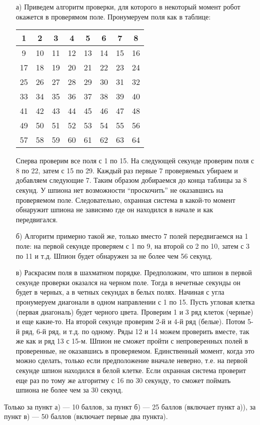 \solutionSection
\begin{enumerate}
    \item [а)] Приведем алгоритм проверки, для которого в некоторый момент робот окажется в проверямом поле. Пронумеруем поля как в таблице:
    \begin{center}
    \begin{tabular}{|c|c|c|c|c|c|c|c|}\hline
     {1} &  {2} &  {3} &  {4} &  {5} &  {6} &  {7} &  {8}\\\hline
     {9} &  {10} &  {11} &  {12} &  {13} &  {14} &  {15} &  {16}\\\hline
     {17} &  {18} &  {19} &  {20} &  {21} &  {22} &  {23} &  {24}\\\hline
     {25} &  {26} &  {27} &  {28} &  {29} &  {30} &  {31} &  {32}\\\hline
     {33} &  {34} &  {35} &  {36} &  {37} &  {38} &  {39} &  {40}\\\hline
     {41} &  {42} &  {43} &  {44} &  {45} &  {46} &  {47} &  {48}\\\hline
     {49} &  {50} &  {51} &  {52} &  {53} &  {54} &  {55} &  {56}\\\hline
     {57} &  {58} &  {59} &  {60} &  {61} &  {62} &  {63} &  {64}\\\hline
    \end{tabular}
    \end{center}
    
    
    Сперва проверим все поля с 1 по 15. На следующей секунде проверим поля с 8 по 22, затем с 15 по 29. Каждый раз первые 7 проверяемых убираем и добавляем следующие 7. Таким образом добираемся до конца таблицы за 8 секунд. У шпиона нет возможности ``проскочить'' не оказавшись на проверяемом поле. Следовательно, охранная система в какой-то момент обнаружит шпиона не зависимо где он находился в начале и как передвигался.
    
    \item [б)] Алгоритм примерно такой же, только вместо 7 полей передвигаемся на 1 поле: на первой секунде проверяем с 1 по 9, на второй со 2 по 10, затем с 3 по 11 и т.д. Шпион будет обнаружен за не более чем 56 секунд.
    
    \item [в)] Раскрасим поля в шахматном порядке. Предположим, что шпион в первой секунде проверки оказался на черном поле. Тогда в нечетные секунды он будет в черных, а в четных секундах в белых полях. Начиная с угла пронумеруем диагонали в одном направлении с 1 по 15. Пусть угловая клетка (первая диагональ) будет черного цвета. Проверим 1 и 3 ряд клеток (черные) и еще какие-то. На второй секунде проверим 2-й и 4-й ряд (белые). Потом 5-й ряд, 6-й ряд, и т.д. по одному. Ряды 12 и 14 можем проверить вместе, так же как и ряд 13 с 15-м. Шпион не сможет пройти с непроверенных полей в проверенные, не оказавшись в проверяемом. Единственный момент, когда это можно сделать, только если предположение вначале неверно, т.е. на первой секунде шпион находился в белой клетке. Если охранная система проверит еще раз по тому же алгоритму с 16 по 30 секунду, то сможет поймать шпиона не более чем за 30 секунд.
    
  
\end{enumerate}

\additionalCriteria 
Только за пункт а) --- 10 баллов, за пункт б) --- 25 баллов (включает пункт а)), за пункт в) --- 50 баллов (включает первые два пункта).

